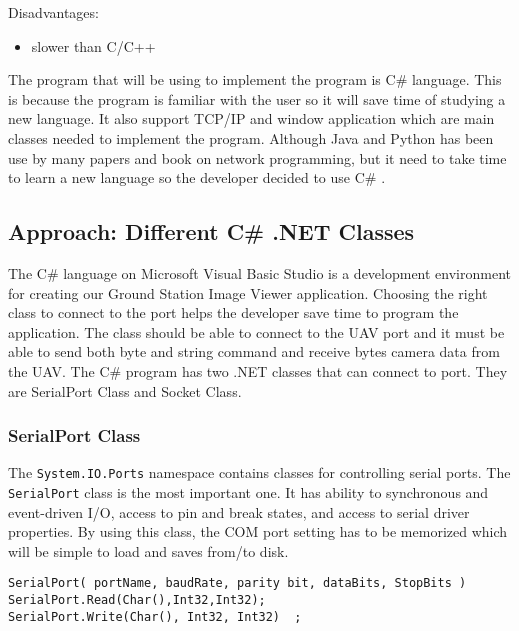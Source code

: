 Disadvantages:
\begin{itemize}
\item slower than C/C++
\end{itemize}

The program that will be using to implement the program is C\# language. 
This is because the program is familiar with the user so it will save time of studying a new language.
It also support TCP/IP and window application which are main classes needed to implement the program.
Although Java and Python has been use by many papers and book on network programming, but it need to take time to learn a new language so the developer decided to use C\# \cite{normanM,guidoR,kennethC,elliotH}.



\subsection{Approach: Different C\# .NET Classes}
The C\# language on Microsoft Visual Basic Studio is a development environment for creating our Ground Station Image Viewer application. Choosing the right class to connect to the port helps the developer save time to program the application. The class should be able to connect to the UAV port and it must be able to send both byte and string command and receive bytes camera data from the UAV.  The C\# program has two .NET classes that can connect to port. They are SerialPort Class and Socket Class.
 
\subsubsection{SerialPort Class}
The \texttt{System.IO.Ports} namespace contains classes for controlling serial ports. 
The \texttt{SerialPort} class is the most important one. It has ability to synchronous and event-driven I/O, access to pin and break states, and access to serial driver properties\cite{peak_netFrame}. 
By using this class, the COM port setting has to be memorized which will be simple to load and saves from/to disk.

\begin{lstlisting}[caption=Serial Port class connection\, read and write method, label=serialPortconn]
SerialPort( portName, baudRate, parity bit, dataBits, StopBits ) 
SerialPort.Read(Char(),Int32,Int32);
SerialPort.Write(Char(), Int32, Int32)	;
\end{lstlisting}


